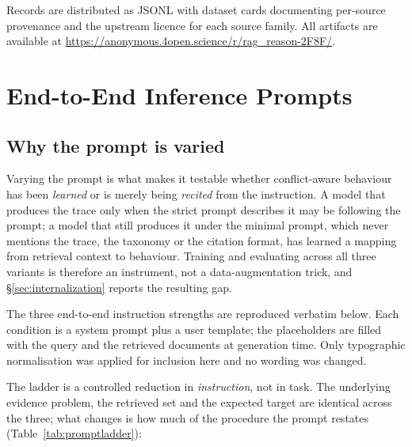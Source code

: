 Records are distributed as JSONL with dataset cards documenting per-source
provenance and the upstream licence for each source family. All artifacts are
available at \url{https://anonymous.4open.science/r/rag_reason-2F8F/}.

\section{End-to-End Inference Prompts}
\label{app:e2eprompts}

\subsection{Why the prompt is varied}

Varying the prompt is what makes it testable whether conflict-aware behaviour has
been \emph{learned} or is merely being \emph{recited} from the instruction. A
model that produces the trace only when the strict prompt describes it may be
following the prompt; a model that still produces it under the minimal prompt,
which never mentions the trace, the taxonomy or the citation format, has learned
a mapping from retrieval context to behaviour. Training and evaluating across all
three variants is therefore an instrument, not a data-augmentation trick, and
\S\ref{sec:internalization} reports the resulting gap.

The three end-to-end instruction strengths are reproduced verbatim below. Each
condition is a system prompt plus a user template; the placeholders are filled
with the query and the retrieved documents at generation time. Only typographic
normalisation was applied for inclusion here and no wording was changed.

The ladder is a controlled reduction in \emph{instruction}, not in task. The
underlying evidence problem, the retrieved set and the expected target are
identical across the three; what changes is how much of the procedure the prompt
restates (Table~\ref{tab:promptladder}):

